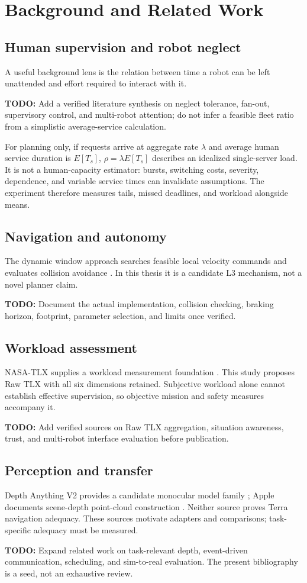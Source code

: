 \documentclass[12pt,oneside]{report}
\newcommand{\todo}[1]{\par\noindent\textcolor{red!65!black}{\textbf{TODO:} #1}\par}
\begin{document}
\chapter{Background and Related Work}
\section{Human supervision and robot neglect}
A useful background lens is the relation between time a robot can be left unattended and effort required to interact with it. \todo{Add a verified literature synthesis on neglect tolerance, fan-out, supervisory control, and multi-robot attention; do not infer a feasible fleet ratio from a simplistic average-service calculation.}
For planning only, if requests arrive at aggregate rate $\lambda$ and average human service duration is $E[T_s]$, $\rho=\lambda E[T_s]$ describes an idealized single-server load. It is not a human-capacity estimator: bursts, switching costs, severity, dependence, and variable service times can invalidate assumptions. The experiment therefore measures tails, missed deadlines, and workload alongside means.
\section{Navigation and autonomy}
The dynamic window approach searches feasible local velocity commands and evaluates collision avoidance \citep{fox1997dwa}. In this thesis it is a candidate L3 mechanism, not a novel planner claim. \todo{Document the actual implementation, collision checking, braking horizon, footprint, parameter selection, and limits once verified.}
\section{Workload assessment}
NASA-TLX supplies a workload measurement foundation \citep{hart1988tlx}. This study proposes Raw TLX with all six dimensions retained. Subjective workload alone cannot establish effective supervision, so objective mission and safety measures accompany it. \todo{Add verified sources on Raw TLX aggregation, situation awareness, trust, and multi-robot interface evaluation before publication.}
\section{Perception and transfer}
Depth Anything V2 provides a candidate monocular model family \citep{yang2024depth}; Apple documents scene-depth point-cloud construction \citep{appleSceneDepth}. Neither source proves Terra navigation adequacy. These sources motivate adapters and comparisons; task-specific adequacy must be measured. \todo{Expand related work on task-relevant depth, event-driven communication, scheduling, and sim-to-real evaluation. The present bibliography is a seed, not an exhaustive review.}
\end{document}
